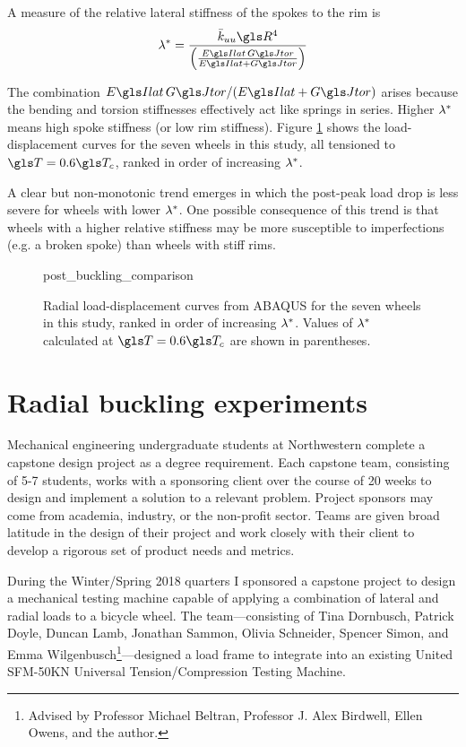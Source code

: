 \documentclass[\rootdir/thesis.tex]{subfiles}
\begin{document}
A measure of the relative lateral stiffness of the spokes to the rim is
\begin{equation}
\lr^* = \frac{\kuu \R^4}{\left(\frac{\EIl\,\GJ}{\EIl+\GJ}\right)}
\end{equation}

The combination $\EIl\,\GJ/(\EIl+\GJ)$ arises because the bending and torsion stiffnesses effectively act like springs in series. Higher $\lambda^*$ means high spoke stiffness (or low rim stiffness). Figure \ref{fig:post_buckling_comparison} shows the load-displacement curves for the seven wheels in this study, all tensioned to $\T=0.6\T_c$, ranked in order of increasing $\lambda^*$.

A clear but non-monotonic trend emerges in which the post-peak load drop is less severe for wheels with lower $\lambda^*$. One possible consequence of this trend is that wheels with a higher relative stiffness may be more susceptible to imperfections (e.g. a broken spoke) than wheels with stiff rims.

\begin{figure}[t]
\centering
{post_buckling_comparison}
\caption{Radial load-displacement curves from ABAQUS for the seven wheels in this study, ranked in order of increasing $\lambda^*$. Values of $\lambda^*$ calculated at $\T=0.6\T_c$ are shown in parentheses.}
\label{fig:post_buckling_comparison}
\end{figure}

\section{Radial buckling experiments}

Mechanical engineering undergraduate students at Northwestern complete a capstone design project as a degree requirement. Each capstone team, consisting of 5-7 students, works with a sponsoring client over the course of 20 weeks to design and implement a solution to a relevant problem. Project sponsors may come from academia, industry, or the non-profit sector. Teams are given broad latitude in the design of their project and work closely with their client to develop a rigorous set of product needs and metrics.

During the Winter/Spring 2018 quarters I sponsored a capstone project to design a mechanical testing machine capable of applying a combination of lateral and radial loads to a bicycle wheel. The team---consisting of Tina Dornbusch, Patrick Doyle, Duncan Lamb, Jonathan Sammon, Olivia Schneider, Spencer Simon, and Emma Wilgenbusch\footnote{Advised by Professor Michael Beltran, Professor J. Alex Birdwell, Ellen Owens, and the author.}---designed a load frame to integrate into an existing United SFM-50KN Universal Tension/Compression Testing Machine.
\end{document}
